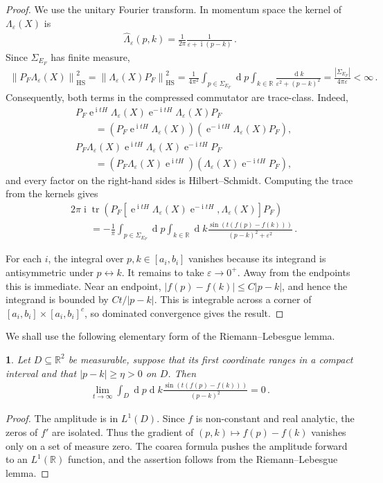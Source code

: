 \documentclass[a4paper,10pt]{article}
\numberwithin{equation}{section}
\theoremstyle{plain}
\theoremstyle{plain}
\newtheorem{lem}[thm]{\protect\lemmaname}
\theoremstyle{plain}
\theoremstyle{plain}
\theoremstyle{plain}
\theoremstyle{remark}
\theoremstyle{definition}
\theoremstyle{plain}
\providecommand{\lemmaname}{Lemma}
\newcommand{\ee}{\operatorname{e}}
\newcommand{\ii}{\operatorname{i}}
\newcommand{\RR}{\mathbb{R}}
\newcommand\norm[1]{\left\lVert#1\right\rVert}
\newcommand{\dif}{\operatorname{d}\!} %
\newcommand{\tr}{\operatorname{tr}}
\newcommand{\ve}{\varepsilon}
\newcommand{\eq}[1]{\begin{align*}#1\end{align*}}
\begin{document}
\begin{proof}
We use the unitary Fourier transform. In momentum space the kernel of $\Lambda_\ve(X)$ is
\eq{\widehat{\Lambda}_\ve(p,k)=\frac{1}{2\pi}\frac{1}{\ve+\ii(p-k)}\,.}
Since $\Sigma_{E_F}$ has finite measure,
\eq{\norm{P_F\Lambda_\ve(X)}_{\mathrm{HS}}^2=\norm{\Lambda_\ve(X)P_F}_{\mathrm{HS}}^2
=\frac{1}{4\pi^2}\int_{p\in\Sigma_{E_F}}\dif{p}\int_{k\in\RR}\frac{\dif{k}}{\ve^2+(p-k)^2}
=\frac{|\Sigma_{E_F}|}{4\pi\ve}<\infty\,.}
Consequently, both terms in the compressed commutator are trace-class. Indeed,
\eq{&P_F\ee^{\ii tH}\Lambda_\ve(X)\ee^{-\ii tH}\Lambda_\ve(X)P_F\\
&\qquad=\left(P_F\ee^{\ii tH}\Lambda_\ve(X)\right)\left(\ee^{-\ii tH}\Lambda_\ve(X)P_F\right),\\
&P_F\Lambda_\ve(X)\ee^{\ii tH}\Lambda_\ve(X)\ee^{-\ii tH}P_F\\
&\qquad=\left(P_F\Lambda_\ve(X)\ee^{\ii tH}\right)\left(\Lambda_\ve(X)\ee^{-\ii tH}P_F\right),}
and every factor on the right-hand sides is Hilbert--Schmidt. Computing the trace from the kernels gives
\eq{&2\pi\ii\tr\left(P_F\left[\ee^{\ii tH}\Lambda_\ve(X)\ee^{-\ii tH},\Lambda_\ve(X)\right]P_F\right)\\
&\qquad=-\frac{1}{\pi}\int_{p\in\Sigma_{E_F}}\dif{p}\int_{k\in\RR}\dif{k}\frac{\sin\left(t(f(p)-f(k))\right)}{(p-k)^2+\ve^2}\,.}

For each $i$, the integral over $p,k\in[a_i,b_i]$ vanishes because its integrand is antisymmetric under $p\leftrightarrow k$. It remains to take $\ve\to0^+$. Away from the endpoints this is immediate. Near an endpoint, $|f(p)-f(k)|\leq C|p-k|$, and hence the integrand is bounded by $Ct/|p-k|$. This is integrable across a corner of $[a_i,b_i]\times[a_i,b_i]^c$, so dominated convergence gives the result.
\end{proof}

We shall use the following elementary form of the Riemann--Lebesgue lemma.

\begin{lem}\label{lem:oscillatory integral}
Let $D\subseteq\RR^2$ be measurable, suppose that its first coordinate ranges in a compact interval and that $|p-k|\geq\eta>0$ on $D$. Then
\eq{\lim_{t\to\infty}\int_D\dif{p}\dif{k}\frac{\sin\left(t(f(p)-f(k))\right)}{(p-k)^2}=0\,.}
\end{lem}

\begin{proof}
The amplitude is in $L^1(D)$. Since $f$ is non-constant and real analytic, the zeros of $f'$ are isolated. Thus the gradient of $(p,k)\mapsto f(p)-f(k)$ vanishes only on a set of measure zero. The coarea formula pushes the amplitude forward to an $L^1(\RR)$ function, and the assertion follows from the Riemann--Lebesgue lemma.
\end{proof}
\end{document}
